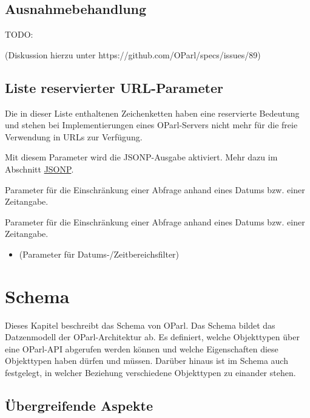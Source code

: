 \documentclass[,a4paper]{article}
\begin{document}
\subsection{Ausnahmebehandlung}\label{ausnahmebehandlung}

TODO:

(Diskussion hierzu unter https://github.com/OParl/specs/issues/89)

\subsection{Liste reservierter
URL-Parameter}\label{liste-reservierter-url-parameter}

Die in dieser Liste enthaltenen Zeichenketten haben eine reservierte
Bedeutung und stehen bei Implementierungen eines OParl-Servers nicht
mehr für die freie Verwendung in URLs zur Verfügung.

\begin{description}
\itemsep1pt\parskip0pt
\item[callback:]
Mit diesem Parameter wird die JSONP-Ausgabe aktiviert. Mehr dazu im
Abschnitt \hyperref[jsonp]{JSONP}.
\item[startdate:]
Parameter für die Einschränkung einer Abfrage anhand eines Datums bzw.
einer Zeitangabe.
\item[enddate:]
Parameter für die Einschränkung einer Abfrage anhand eines Datums bzw.
einer Zeitangabe.
\end{description}

\begin{itemize}
\itemsep1pt\parskip0pt
\item
  (Parameter für Datums-/Zeitbereichsfilter)
\end{itemize}

\section{Schema}\label{schema}

Dieses Kapitel beschreibt das Schema von OParl. Das Schema bildet das
Datzenmodell der OParl-Architektur ab. Es definiert, welche Objekttypen
über eine OParl-API abgerufen werden können und welche Eigenschaften
diese Objekttypen haben dürfen und müssen. Darüber hinaus ist im Schema
auch festgelegt, in welcher Beziehung verschiedene Objekttypen zu
einander stehen.

\subsection{Übergreifende Aspekte}\label{uxfcbergreifende-aspekte}
\end{document}
